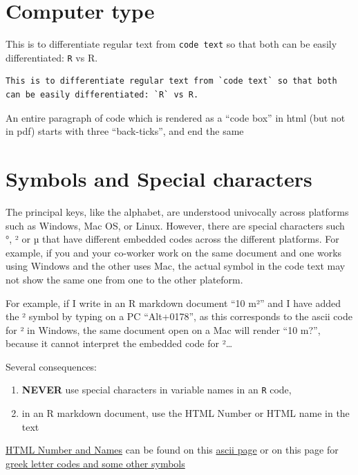 \documentclass[]{book}
\providecommand{\tightlist}{%
  \setlength{\itemsep}{0pt}\setlength{\parskip}{0pt}}
\theoremstyle{definition}
\theoremstyle{definition}
\theoremstyle{definition}
\theoremstyle{remark}
\begin{document}
\section{Computer type}\label{computer-type}

This is to differentiate regular text from \texttt{code\ text} so that
both can be easily differentiated: \texttt{R} vs R.

\begin{verbatim}
This is to differentiate regular text from `code text` so that both can be easily differentiated: `R` vs R.
\end{verbatim}

An entire paragraph of code which is rendered as a ``code box'' in html
(but not in pdf) starts with three ``back-ticks'', and end the same

\section{Symbols and Special
characters}\label{symbols-and-special-characters}

The principal keys, like the alphabet, are understood univocally across
platforms such as Windows, Mac OS, or Linux. However, there are special
characters such °, ² or µ that have different embedded codes across the
different platforms. For example, if you and your co-worker work on the
same document and one works using Windows and the other uses Mac, the
actual symbol in the code text may not show the same one from one to the
other plateform.

For example, if I write in an R markdown document ``10 m²'' and I have
added the ² symbol by typing on a PC ``Alt+0178'', as this corresponds
to the ascii code for ² in Windows, the same document open on a Mac will
render ``10 m?'', because it cannot interpret the embedded code for
²\ldots{}

Several consequences:

\begin{enumerate}
\def\labelenumi{\arabic{enumi}.}
\tightlist
\item
  \textbf{NEVER} use special characters in variable names in an
  \texttt{R} code,
\item
  in an R markdown document, use the HTML Number or HTML name in the
  text
\end{enumerate}

\href{https://www.ascii.cl/htmlcodes.htm}{HTML Number and Names} can be
found on this \href{https://www.ascii.cl/htmlcodes.htm}{ascii page} or
on this page for
\href{http://www.dionysia.org/html/entities/symbols.html}{greek letter
codes and some other symbols}
\end{document}
